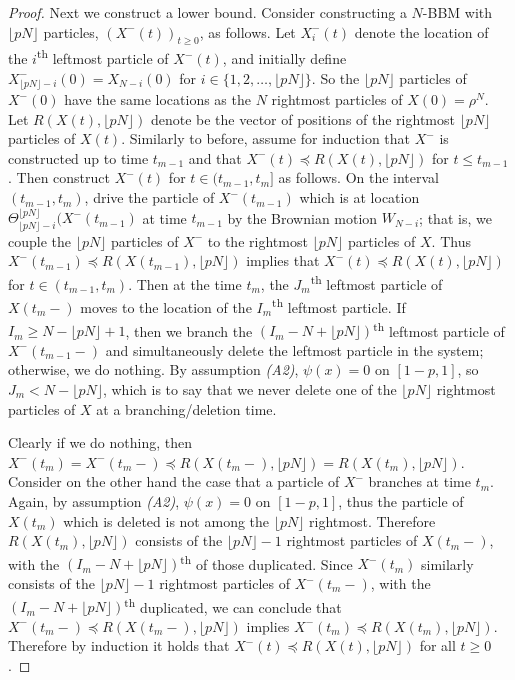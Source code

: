 \documentclass{article}
\newcommand{\oop}{\preccurlyeq}
\begin{document}
\begin{proof}
    Next we construct a lower bound. Consider constructing a $N$-BBM with $\lfloor pN\rfloor$ particles, $(X^-(t))_{t\geq 0}$, as follows. 
    Let $X^-_i(t)$ denote the location of the $i$\textsuperscript{th} leftmost particle of $X^-(t)$, and initially define $X^-_{\lfloor pN\rfloor - i}(0)=X_{N-i}(0)$ for $i \in {\{1,2,\ldots,\lfloor pN\rfloor\}}$. So the $\lfloor pN\rfloor$ particles of $X^-(0)$ have the same locations as the $N$ rightmost particles of $X(0)=\rho^N$. Let $R(X(t),\lfloor pN\rfloor)$ denote be the vector of positions of the rightmost $\lfloor pN\rfloor$ particles of $X(t)$. Similarly to before, assume for induction that $X^-$ is constructed up to time $t_{m-1}$ and that $X^-(t)\oop R(X(t),\lfloor pN\rfloor)$ for $t\leq t_{m-1}$. Then construct $X^-(t)$ for $t\in (t_{m-1},t_m]$ as follows. On the interval $(t_{m-1},t_m)$, drive the particle of $X^-(t_{m-1})$ which is at location $\Theta^{\lfloor pN\rfloor}_{\lfloor pN\rfloor - i}(X^-(t_{m-1})$ at time $t_{m-1}$ by the Brownian motion $W_{N-i}$; that is, we couple the $\lfloor pN\rfloor$ particles of $X^-$ to the rightmost $\lfloor pN\rfloor$ particles of $X$. Thus $X^-(t_{m-1})\oop R(X(t_{m-1}),\lfloor pN\rfloor)$ implies that $X^-(t)\oop R(X(t),\lfloor pN\rfloor)$ for $t\in (t_{m-1},t_m)$. Then at the time $t_m$, the $J_m$\textsuperscript{th} leftmost particle of $X(t_m-)$ moves to the location of the $I_m$\textsuperscript{th} leftmost particle. If $I_m\geq N-\lfloor pN\rfloor + 1$, then we branch the $(I_m-N+\lfloor pN\rfloor)$\textsuperscript{th} leftmost particle of $X^-(t_{m-1}-)$ and simultaneously delete the leftmost particle in the system; otherwise, we do nothing. By assumption \textit{(A2)}, $\psi(x)=0$ on $[1-p,1]$, so $J_m<N-\lfloor pN\rfloor$, which is to say that we never delete one of the $\lfloor pN\rfloor$ rightmost particles of $X$ at a branching/deletion time. 
    
    Clearly if we do nothing, then $X^-(t_m)=X^-(t_{m}-)\oop R(X(t_{m}-),\lfloor pN\rfloor)= R(X(t_{m}),\lfloor pN\rfloor)$. Consider on the other hand the case that a particle of $X^-$ branches at time $t_m$. Again, by assumption \textit{(A2)}, $\psi(x)=0$ on $[1-p,1]$, thus the particle of $X(t_{m})$ which is deleted is not among the $\lfloor pN\rfloor$ rightmost. Therefore $R(X(t_m),\lfloor pN\rfloor )$ consists of the $\lfloor pN\rfloor-1$ rightmost particles of $X(t_m-)$, with the $(I_m-N+\lfloor pN\rfloor)$\textsuperscript{th} of those duplicated. Since $X^-(t_m)$ similarly consists of the $\lfloor pN\rfloor-1$ rightmost particles of $X^-(t_m-)$, with the $(I_m-N+\lfloor pN\rfloor)$\textsuperscript{th} duplicated, we can conclude that $X^-(t_m-)\oop R(X(t_m-),\lfloor pN\rfloor )$ implies $X^-(t_m)\oop R(X(t_m),\lfloor pN\rfloor )$. Therefore by induction it holds that $X^-(t)\oop R(X(t),\lfloor pN\rfloor)$ for all $t\geq 0$. 


\end{proof}
\end{document}
